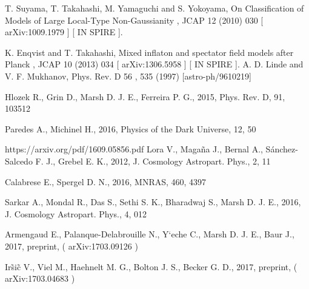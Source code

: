 \documentclass[amssymb,twocolumn,prd,nofootinbib,showpacs]{revtex4-1}
\begin{document}
\begin{thebibliography}{9}
T. Suyama, T. Takahashi, M. Yamaguchi and S. Yokoyama,
On Classification of Models of
Large Local-Type Non-Gaussianity
,
JCAP
12
(2010) 030
[
arXiv:1009.1979
] [
IN
SPIRE
].

 K. Enqvist and T. Takahashi,
Mixed inflaton and spectator field models after Planck
,
JCAP
10
(2013) 034 [
arXiv:1306.5958
] [
IN
SPIRE
].
 A. D. Linde and V. F. Mukhanov, Phys. Rev. D
56
, 535 (1997) [astro-ph/9610219]

Hlozek R., Grin D., Marsh D. J. E., Ferreira P. G., 2015, Phys.
Rev. D, 91, 103512

Paredes A., Michinel H., 2016, Physics of the Dark Universe, 12,
50

https://arxiv.org/pdf/1609.05856.pdf
Lora  V.,  Maga\~na  J.,  Bernal  A.,  S\'anchez-Salcedo  F.  J.,  Grebel
E. K., 2012, J. Cosmology Astropart. Phys., 2, 11

Calabrese E., Spergel D. N., 2016, MNRAS, 460, 4397

Sarkar A., Mondal R., Das S., Sethi S. K., Bharadwaj S., Marsh
D. J. E., 2016, J. Cosmology Astropart. Phys., 4, 012

Armengaud   E.,   Palanque-Delabrouille   N.,   Y`eche   C.,   Marsh
D. J. E., Baur J., 2017, preprint,  (
arXiv:1703.09126
)

 Ir\~si\~c  V.,  Viel  M.,  Haehnelt  M.  G.,  Bolton  J.  S.,  Becker  G.  D.,
2017, preprint,  (
arXiv:1703.04683
)


\end{thebibliography}
\end{document}
